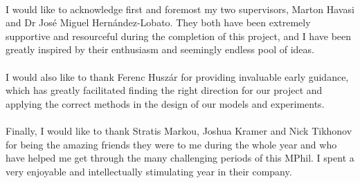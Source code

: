 
\begin{acknowledgements}      

\paragraph{}

I would like to acknowledge first and foremost my two supervisors, Marton Havasi
and Dr Jos\'e Miguel Hern\'andez-Lobato. They both have been extremely supportive
and resourceful during the completion of this project, and I have been greatly
inspired by their enthusiasm and seemingly endless pool of ideas.

\paragraph{}

I would also like to thank Ferenc Husz\'ar for providing invaluable early
guidance, which has greatly facilitated finding the right direction for our
project and applying the correct methods in the design of our models and
experiments.

\paragraph{}

Finally, I would like to thank Stratis Markou, Joshua Kramer and Nick Tikhonov
for being the amazing friends they were to me during the whole year and who have
helped me get through the many challenging periods of this MPhil. I spent a very
enjoyable and intellectually stimulating year in their company.

\end{acknowledgements}
